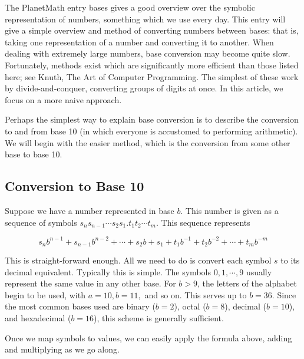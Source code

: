 \documentclass[12pt]{article}
\begin{document}

The PlanetMath entry bases gives a good overview over the symbolic representation of numbers, something which we use every day.  This entry will give a simple overview and method of converting numbers between bases: that is, taking one representation of a number and converting it to another.  When dealing with extremely large numbers, base conversion may become quite slow.  Fortunately, methods exist which are significantly more efficient than those listed here; see Knuth, The Art of Computer Programming.  The simplest of these work by divide-and-conquer, converting groups of digits at once.  In this article, we focus on a more naive approach.

Perhaps the simplest way to explain base conversion is to describe the conversion to and from base 10 (in which everyone is accustomed to performing arithmetic).  We will begin with the easier method, which is the conversion from some other base to base 10.

\subsection*{Conversion to Base 10}

Suppose we have a number represented in base $b$.  This number is given as a sequence of symbols $s_n s_{n-1} \cdots s_2 s_1 . t_1 t_2 \cdots t_m$.  This sequence represents

$$
s_n b^{n-1} + s_{n-1} b^{n-2} + \cdots + s_2 b + s_1 + t_1 b^{-1} + t_2 b^{-2} + \cdots + t_m b^{-m}
$$

This is straight-forward enough.  All we need to do is convert each symbol $s$ to its decimal equivalent.  Typically this is simple.  The symbols $0,1,\cdots, 9$ usually represent the same value in any other base.  For $b > 9$, the letters of the alphabet begin to be used, with $a = 10, b = 11,$ and so on.  This serves up to $b = 36$.  Since the most common bases used are binary ($b = 2$), octal ($b = 8$), decimal ($b = 10$), and hexadecimal ($b = 16$), this scheme is generally sufficient.

Once we map symbols to values, we can easily apply the formula above, adding and multiplying as we go along.
\end{document}
